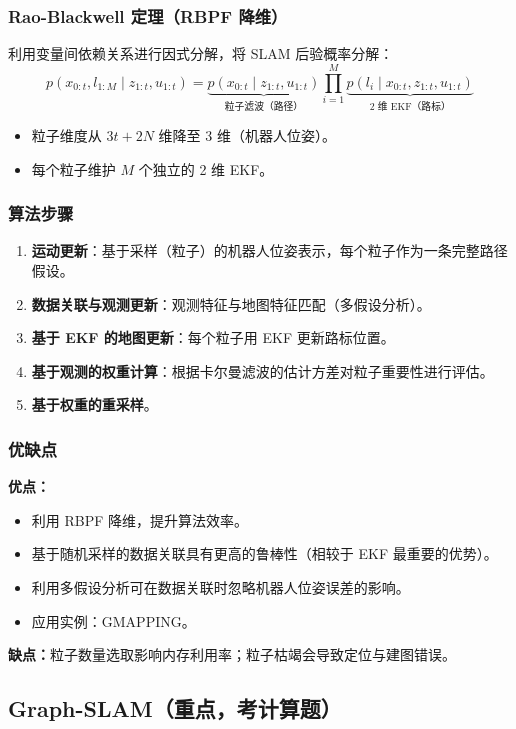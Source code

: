 \documentclass[11pt,a4paper]{article}
\begin{document}
\subsubsection*{Rao-Blackwell 定理（RBPF 降维）}
利用变量间依赖关系进行因式分解，将 SLAM 后验概率分解：
\[
p(x_{0:t},l_{1:M}\mid z_{1:t},u_{1:t})
=\underbrace{p(x_{0:t}\mid z_{1:t},u_{1:t})}_{\text{粒子滤波（路径）}}
\prod_{i=1}^M \underbrace{p(l_i\mid x_{0:t},z_{1:t},u_{1:t})}_{\text{2 维 EKF（路标）}}
\]
\begin{itemize}
  \item 粒子维度从 $3t+2N$ 维降至 3 维（机器人位姿）。
  \item 每个粒子维护 $M$ 个独立的 2 维 EKF。
\end{itemize}

\subsubsection*{算法步骤}
\begin{enumerate}
  \item \textbf{运动更新}：基于采样（粒子）的机器人位姿表示，每个粒子作为一条完整路径假设。
  \item \textbf{数据关联与观测更新}：观测特征与地图特征匹配（多假设分析）。
  \item \textbf{基于 EKF 的地图更新}：每个粒子用 EKF 更新路标位置。
  \item \textbf{基于观测的权重计算}：根据卡尔曼滤波的估计方差对粒子重要性进行评估。
  \item \textbf{基于权重的重采样}。
\end{enumerate}

\subsubsection*{优缺点}
\begin{notebox}
\textbf{优点：}
\begin{itemize}
  \item 利用 RBPF 降维，提升算法效率。
  \item 基于随机采样的数据关联具有更高的鲁棒性（相较于 EKF 最重要的优势）。
  \item 利用多假设分析可在数据关联时忽略机器人位姿误差的影响。
  \item 应用实例：GMAPPING。
\end{itemize}
\textbf{缺点：}粒子数量选取影响内存利用率；粒子枯竭会导致定位与建图错误。
\end{notebox}

\subsection{Graph-SLAM（重点，考计算题）}
\end{document}

